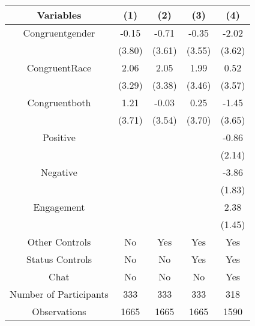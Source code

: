 \begin{table}[htbp]
    \begin{tabular}{c c c c c}
    \toprule
    \textbf{Variables} & \textbf{(1)} & \textbf{(2)} & \textbf{(3)}      & \textbf{(4)}     \\ 
\midrule
Congruentgender            &     -0.15              &     -0.71          &  -0.35            &  -2.02 \\
                                            &     (3.80)             &     (3.61)         &  (3.55)           &  (3.62) \\
\addlinespace
CongruentRace           &      2.06              &     2.05           &   1.99            &  0.52   \\
                                            &      (3.29)            &     (3.38)         &   (3.46)          &  (3.57) \\
\addlinespace
Congruentboth                &      1.21              &     -0.03           &  0.25                & -1.45  \\
                                            &      (3.71)             &    (3.54)          &  (3.70)            &  (3.65) \\
\addlinespace
Positive                         &                     &                     &              & -0.86  \\
                                 &                     &                     &              &  (2.14)  \\
\addlinespace
Negative                         &                     &                     &            &  -3.86\sym{**}  \\
                                 &           &                     &                    &  (1.83)  \\
\addlinespace
Engagement                       &                     &     &                    &  2.38\sym{*}  \\
                                 &                     &   &                    &  (1.45)  \\


\midrule
Other Controls                   &    No                &    Yes              &    Yes          &    Yes        \\
Status Controls                    &    No                &    No               &    Yes          &    Yes        \\
Chat                             &    No                &    No               &    No           &    Yes        \\
\midrule
Number of Participants           &    333               &    333              &    333          &    318       \\
\midrule
Observations                     &       1665           &       1665          &  1665           &  1590    \\
\bottomrule
 

\end{tabular}
\end{table}
